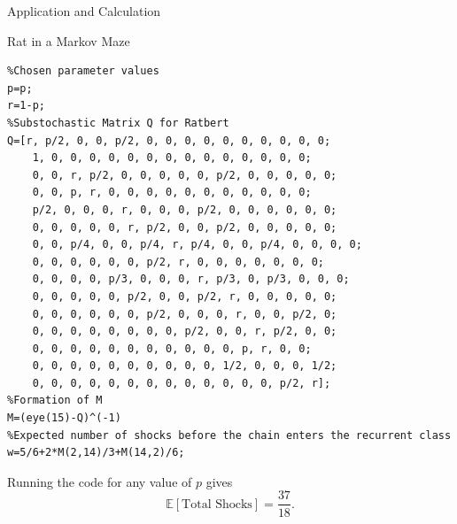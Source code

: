 \documentclass[12pt]{article}
\numberwithin{equation}{section}
\begin{document}
\begin{section}{Application and Calculation}
\begin{subsection}{Rat in a Markov Maze}
\begin{enumerate}
\begin{lstlisting}
%Chosen parameter values
p=p;
r=1-p;
%Substochastic Matrix Q for Ratbert
Q=[r, p/2, 0, 0, p/2, 0, 0, 0, 0, 0, 0, 0, 0, 0, 0;
    1, 0, 0, 0, 0, 0, 0, 0, 0, 0, 0, 0, 0, 0, 0;
    0, 0, r, p/2, 0, 0, 0, 0, 0, p/2, 0, 0, 0, 0, 0;
    0, 0, p, r, 0, 0, 0, 0, 0, 0, 0, 0, 0, 0, 0;
    p/2, 0, 0, 0, r, 0, 0, 0, p/2, 0, 0, 0, 0, 0, 0;
    0, 0, 0, 0, 0, r, p/2, 0, 0, p/2, 0, 0, 0, 0, 0;
    0, 0, p/4, 0, 0, p/4, r, p/4, 0, 0, p/4, 0, 0, 0, 0;
    0, 0, 0, 0, 0, 0, p/2, r, 0, 0, 0, 0, 0, 0, 0;
    0, 0, 0, 0, p/3, 0, 0, 0, r, p/3, 0, p/3, 0, 0, 0;
    0, 0, 0, 0, 0, p/2, 0, 0, p/2, r, 0, 0, 0, 0, 0;
    0, 0, 0, 0, 0, 0, p/2, 0, 0, 0, r, 0, 0, p/2, 0;
    0, 0, 0, 0, 0, 0, 0, 0, p/2, 0, 0, r, p/2, 0, 0;
    0, 0, 0, 0, 0, 0, 0, 0, 0, 0, 0, p, r, 0, 0;
    0, 0, 0, 0, 0, 0, 0, 0, 0, 0, 1/2, 0, 0, 0, 1/2;
    0, 0, 0, 0, 0, 0, 0, 0, 0, 0, 0, 0, 0, p/2, r];
%Formation of M
M=(eye(15)-Q)^(-1)
%Expected number of shocks before the chain enters the recurrent class
w=5/6+2*M(2,14)/3+M(14,2)/6;
\end{lstlisting}
Running the code for any value of $p$ gives
$$\mathbb{E}[\text{Total Shocks}]=\frac{37}{18}.$$

\end{enumerate}
\end{subsection}
\end{section}
\end{document}
